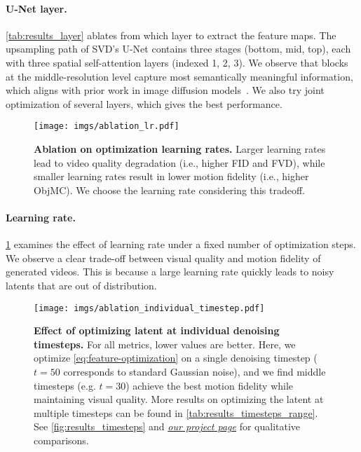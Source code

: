 \documentclass{article} \usepackage{iclr2025_conference,times}
\begin{document}
\vspace{-2.0mm}
\paragraph{U-Net layer.}
\cref{tab:results_layer} ablates from which layer to extract the feature maps.
The upsampling path of SVD's U-Net contains three stages (bottom, mid, top), each with three spatial self-attention layers (indexed 1, 2, 3).
We observe that blocks at the middle-resolution level capture most semantically meaningful information, which aligns with prior work in image diffusion models~\citep{shi2024dragdiffusion,tang2023emergent}.
We also try joint optimization of several layers, which gives the best performance.


\begin{figure}[!t]
\vspace{-4mm}
\centering
\texttt{[image: imgs/ablation\_lr.pdf]}
\caption{\textbf{Ablation on optimization learning rates.} Larger learning rates lead to video quality degradation (i.e., higher FID and FVD), while smaller learning rates result in lower motion fidelity (i.e., higher ObjMC). We choose the learning rate considering this tradeoff. }
\label{tab:results_lr}
\vspace{-2.5mm}
\end{figure}

\vspace{-2.0mm}
\paragraph{Learning rate.}
\cref{tab:results_lr} examines the effect of learning rate under a fixed number of optimization steps. 
We observe a clear trade-off between visual quality and motion fidelity of generated videos.
This is because a large learning rate quickly leads to noisy latents that are out of distribution. \begin{figure}[!t]
\centering
\texttt{[image: imgs/ablation\_individual\_timestep.pdf]}
\caption{\textbf{Effect of optimizing latent at individual denoising timesteps.}
For all metrics, lower values are better.
Here, we optimize \cref{eq:feature-optimization} on a single denoising timestep ($t=50$ corresponds to standard Gaussian noise), and we find middle timesteps (e.g. $t=30$) achieve the best motion fidelity while maintaining visual quality.
More results on optimizing the latent at multiple timesteps can be found in \cref{tab:results_timesteps_range}.
See \cref{fig:results_timesteps} and \href{https://kmcode1.github.io/Projects/SG-I2V\#ablation-denoising-timestep}{\textit{our project page}} for qualitative comparisons.
}
\label{tab:results_timesteps}
\vspace{-2.5mm}
\end{figure}
\vspace{-3.0mm}
\end{document}
